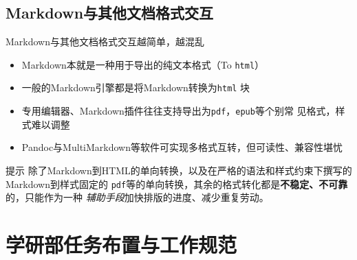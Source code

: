 \documentclass[10pt]{beamer}
\begin{document}
\subsection{Markdown与其他文档格式交互}
\begin{frame}{Markdown与其他文档格式交互}{越简单，越混乱}
\begin{itemize}
    \item Markdown本就是一种用于导出的纯文本格式（To \texttt{html}）
    \item 一般的Markdown引擎都是将Markdown转换为\texttt{html} 块
    \item 专用编辑器、Markdown插件往往支持导出为\texttt{pdf}，\texttt{epub}等个别常
    见格式，样式难以调整
    \item Pandoc与MultiMarkdown等软件可实现多格式互转，但可读性、兼容性堪忧
\end{itemize}

\begin{block}{提示}
除了Markdown到HTML的单向转换，以及在严格的语法和样式约束下撰写的Markdown到样式固定的
\texttt{pdf}等的单向转换，其余的格式转化都是\textbf{不稳定、不可靠}的，只能作为一种
\textit{辅助手段}加快排版的进度、减少重复劳动。
\end{block}
\end{frame}

\section{学研部任务布置与工作规范}
\end{document}
